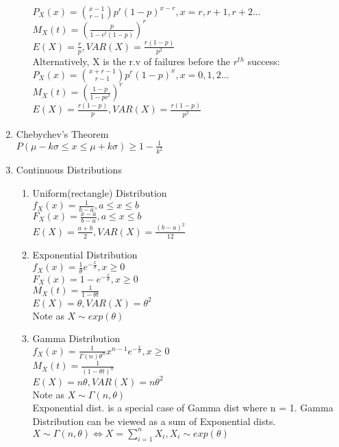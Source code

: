 \documentclass[10pt]{article}
\begin{document}
\begin{multicols}{2}
\begin{enumerate}
\begin{enumerate}
				$P_X(x) = {x-1 \choose r-1}p^r(1-p)^{x-r}, x = r,r+1,r+2 \dots$\\
				$M_X(t) = (\frac{p}{1-e^t(1-p)})^r$\\
				$E(X) = \frac{r}{p}, VAR(X) = \frac{r(1-p)}{p^2}$\\
				Alternatively, X is the r.v of failures before the $r^{th}$ success:\\
				$P_X(x) = {x+r-1 \choose r-1}p^r(1-p)^x, x = 0,1,2 \dots$\\
				$M_X(t) = (\frac{1-p}{1-pe^t})^r$\\
				$E(X) = \frac{r(1-p)}{p}, VAR(X) = \frac{r(1-p)}{p^2}$\\
			\end{enumerate}
			\item Chebychev's Theorem\\
			$P(\mu-k\sigma \le x \le \mu+k\sigma) \ge 1-\frac{1}{k^2}$
		
			\item Continuous Distributions
			\begin{enumerate}
				\item Uniform(rectangle) Distribution\\
				$f_X(x) = \frac{1}{b-a}, a \le x \le b$\\
				$F_X(x) = \frac{x-a}{b-a}, a\le x \le b$\\
				$E(X) = \frac{a+b}{2}, VAR(X) = \frac{(b-a)^2}{12}$
				\item Exponential Distribution\\
				$f_X(x) = \frac{1}{\theta}e^{-\frac{x}{\theta}}, x \ge 0$\\
				$F_X(x) = 1- e^{-\frac{x}{\theta}}, x \ge 0$\\
				$M_X(t) = \frac{1}{1-\theta t}$\\
				$E(X) = \theta, VAR(X) = \theta^2$\\
				Note as $X \sim exp(\theta)$
				\item Gamma Distribution\\
				$f_X(x)= \frac{1}{\Gamma(n)\theta^n}x^{n-1}e^{-\frac{x}{\theta}}, x \ge 0$\\
				$M_X(t) = \frac{1}{(1-\theta t)^n}$\\
				$E(X) = n\theta, VAR(X) = n\theta^2$\\
				Note as $X \sim \Gamma(n,\theta)$\\
				Exponential dist. is a special case of Gamma dist where n = 1. Gamma Distribution can be viewed as a sum of Exponential dists.\\
				$X \sim \Gamma(n,\theta) \Leftrightarrow X = \sum_{i = 1}^{n} X_i, X_i \sim exp(\theta)$
			\end{enumerate}
		\end{enumerate}
		\newpage
	\end{multicols}
\end{document}
